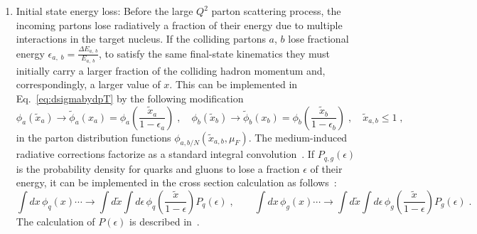 \documentclass[article,showpacs,preprintnumbers,amsmath,amssymb]{revtex4}
\begin{document}
\begin{enumerate}
\item{Initial state energy loss: Before the large $Q^2$ parton scattering process, 
the incoming partons lose radiatively a fraction of their energy due to 
multiple interactions in the target nucleus. If the colliding partons $a$, $b$ lose
fractional energy $\epsilon_{a,\;b}=\frac{\Delta E_{a,\;b}}{E_{a,\;b}}$, to
satisfy the same final-state kinematics they must initially carry a larger
fraction of the colliding hadron momentum and, correspondingly, a larger value
of $x$. 
This can be implemented in Eq.~\ref{eq:dsigmabydpT} by the following
modification
\begin{equation}
\phi_a({\tilde{x}}_{a}) \rightarrow \tilde{\phi}_a(x_a) 
= \phi_a\left(\frac{ {\tilde{x}}_{a}}{1-\epsilon_{a}}\right) \;,\quad
\phi_b({\tilde{x}}_{b}) \rightarrow \tilde{\phi}_b(x_b)
=\phi_b\left(\frac{ {\tilde{x}}_{b}}{1-\epsilon_{b}}\right)\;,
\quad 
{\tilde{x}}_{a,b} \leq 1 \; , 
\end{equation}
in the parton distribution functions $\phi_{a,b/N}({\tilde{x}}_{a,b}, \mu_F)$. 
The medium-induced radiative corrections factorize as a standard integral
convolution~\cite{Ovanesyan:2011kn}. If $P_{q,g}(\epsilon)$ is the probability
density for quarks and gluons to lose a fraction $\epsilon$ of their energy, it
can be implemented in the cross section calculation as
follows~\cite{Neufeld:2011}:  
\begin{equation}
\int dx \, \phi_{q}(x) \cdots \rightarrow \int d\tilde{x} \int d\epsilon \,
\phi_q\left(\frac{\tilde{x}}{1-\epsilon}\right)P_q(\epsilon) \;,  \qquad
\int dx \, \phi_{g}(x) \cdots \rightarrow \int d\tilde{x} \int d\epsilon \,
\phi_g\left(\frac{\tilde{x}}{1-\epsilon}\right)P_g(\epsilon) \; .
\end{equation}
The calculation of $P(\epsilon)$ is described in~\cite{Vitev:2006}.}




\end{enumerate}
\end{document}
